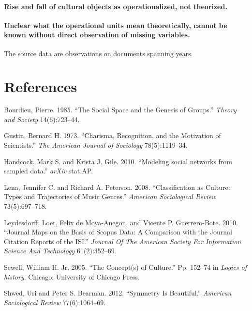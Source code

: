 \documentclass[]{article}
\begin{document}
\paragraph{Rise and fall of cultural objects as operationalized, not
theorized.}\label{rise-and-fall-of-cultural-objects-as-operationalized-not-theorized.}

\paragraph{Unclear what the operational units mean theoretically, cannot
be known without direct observation of missing
variables.}\label{unclear-what-the-operational-units-mean-theoretically-cannot-be-known-without-direct-observation-of-missing-variables.}

The source data are observations on documents spanning years.

\section*{References}\label{references}

Bourdieu, Pierre. 1985. ``The Social Space and the Genesis of Groups.''
\emph{Theory and Society} 14(6):723--44.

Gustin, Bernard H. 1973. ``Charisma, Recognition, and the Motivation of
Scientists.'' \emph{The American Journal of Sociology} 78(5):1119--34.

Handcock, Mark S. and Krista J. Gile. 2010. ``Modeling social networks
from sampled data.'' \emph{arXiv} stat.AP.

Lena, Jennifer C. and Richard A. Peterson. 2008. ``Classification as
Culture: Types and Trajectories of Music Genres.'' \emph{American
Sociological Review} 73(5):697--718.

Leydesdorff, Loet, Felix de Moya-Anegon, and Vicente P. Guerrero-Bote.
2010. ``Journal Maps on the Basis of Scopus Data: A Comparison with the
Journal Citation Reports of the ISI.'' \emph{Journal Of The American
Society For Information Science And Technology} 61(2):352--69.

Sewell, William H. Jr. 2005. ``The Concept(s) of Culture.'' Pp. 152--74
in \emph{Logics of history}. Chicago: University of Chicago Press.

Shwed, Uri and Peter S. Bearman. 2012. ``Symmetry Is Beautiful.''
\emph{American Sociological Review} 77(6):1064--69.
\end{document}
